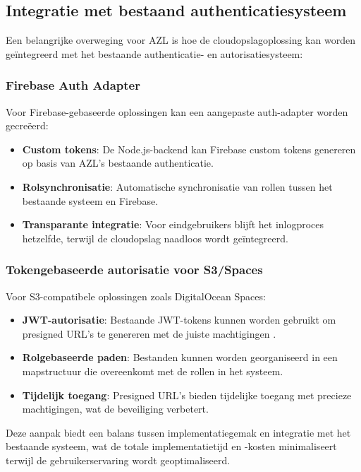 \subsection{Integratie met bestaand authenticatiesysteem}
Een belangrijke overweging voor AZL is hoe de cloudopslagoplossing kan worden geïntegreerd met het bestaande authenticatie- en autorisatiesysteem:

\subsubsection{Firebase Auth Adapter}
Voor Firebase-gebaseerde oplossingen kan een aangepaste auth-adapter worden gecreëerd:

\begin{itemize}
  \item \textbf{Custom tokens}: De Node.js-backend kan Firebase custom tokens genereren op basis van AZL's bestaande authenticatie.
  \item \textbf{Rolsynchronisatie}: Automatische synchronisatie van rollen tussen het bestaande systeem en Firebase.
  \item \textbf{Transparante integratie}: Voor eindgebruikers blijft het inlogproces hetzelfde, terwijl de cloudopslag naadloos wordt geïntegreerd.
\end{itemize}

\subsubsection{Tokengebaseerde autorisatie voor S3/Spaces}
Voor S3-compatibele oplossingen zoals DigitalOcean Spaces:

\begin{itemize}
  \item \textbf{JWT-autorisatie}: Bestaande JWT-tokens kunnen worden gebruikt om presigned URL's te genereren met de juiste machtigingen \autocite{jwt_auth}.
  \item \textbf{Rolgebaseerde paden}: Bestanden kunnen worden georganiseerd in een mapstructuur die overeenkomt met de rollen in het systeem.
  \item \textbf{Tijdelijk toegang}: Presigned URL's bieden tijdelijke toegang met precieze machtigingen, wat de beveiliging verbetert.
\end{itemize}

Deze aanpak biedt een balans tussen implementatiegemak en integratie met het bestaande systeem, wat de totale implementatietijd en -kosten minimaliseert terwijl de gebruikerservaring wordt geoptimaliseerd.

